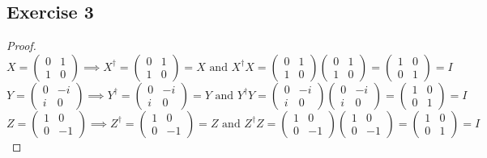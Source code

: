 \documentclass{article}
\begin{document}
\subsection*{Exercise 3}
\begin{proof}
$$X = \begin{pmatrix}0 & 1 \\ 1 & 0\end{pmatrix} \implies X^\dag = \begin{pmatrix}0 & 1 \\ 1 & 0\end{pmatrix} = X \text{ and } X^\dag X = \begin{pmatrix}0 & 1 \\ 1 & 0\end{pmatrix}\begin{pmatrix}0 & 1 \\ 1 & 0\end{pmatrix} = \begin{pmatrix}1 & 0 \\ 0 & 1\end{pmatrix} = I$$
$$Y = \begin{pmatrix}0 & -i \\ i & 0\end{pmatrix} \implies Y^\dag = \begin{pmatrix}0 & -i \\ i & 0\end{pmatrix} = Y \text{ and } Y^\dag Y = \begin{pmatrix}0 & -i \\ i & 0\end{pmatrix}\begin{pmatrix}0 & -i \\ i & 0\end{pmatrix} = \begin{pmatrix}1 & 0 \\ 0 & 1\end{pmatrix} = I$$
$$Z = \begin{pmatrix}1 & 0 \\ 0 & -1\end{pmatrix} \implies Z^\dag = \begin{pmatrix}1 & 0 \\ 0 & -1\end{pmatrix} = Z \text{ and } Z^\dag Z = \begin{pmatrix}1 & 0 \\ 0 & -1\end{pmatrix}\begin{pmatrix}1 & 0 \\ 0 & -1\end{pmatrix} = \begin{pmatrix}1 & 0 \\ 0 & 1\end{pmatrix} = I$$


\end{proof}
\end{document}
